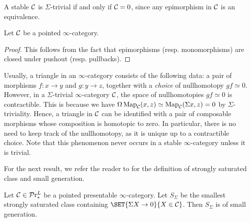 \documentclass[10pt,a4paper,oneside]{article}
\begin{document}
\begin{rem}
A stable \infcat $\mathcal{C}$ is $\Sigma$-trivial if and only if $\mathcal{C}=0$, since any epimorphism in $\mathcal{C}$ is an equivalence.
\end{rem}

\begin{lem}
Let $\mathcal{C}$ be a pointed $\infty$-category.
\end{lem}

\begin{proof}
This follows from the fact that epimorphisms (resp. monomorphisms) are closed under pushout (resp. pullbacks).
\end{proof}


\begin{rem}
Usually, a triangle
in an $\infty$-category consists of the following data: a pair of morphisms
$f \colon x \to y$ and $g \colon y \to z$, together with a \textit{choice} of nullhomotopy
$g f \simeq 0$.
However, in a $\Sigma$-trivial $\infty$-category $\mathcal{C}$, the space of nullhomotopies $g f \simeq 0$ is contractible. This is because we have $\Omega\operatorname{Map}_{\mathcal{C}}(x,z) \simeq \operatorname{Map}_{\mathcal{C}}(\Sigma x, z) = 0$ by $\Sigma$-triviality. Hence, a triangle in $\mathcal{C}$ can be identified with a pair of composable morphisms whose composition is homotopic to zero. In particular, there is no need to keep track of the nullhomotopy, as it is unique up to a contractible choice. Note that this phenomenon never occurs in a stable $\infty$-category unless it is trivial.
\end{rem}



\begin{rem}
For the next result, we refer the reader to \cite[Definition~5.5.4.5 and Remark~5.5.4.7]{htt} for the definition of strongly saturated class and small generation.
\end{rem}

\begin{lem}\label{Ssigma}
Let $\mathcal{C}\in\mathcal{P}\mathrm{r}^L_{*}$ be a pointed presentable $\infty$-category. Let $S_\Sigma$ be the smallest strongly saturated class containing $\SET{\Sigma X\to 0}{X\in\mcc}$. Then $S_\Sigma$ is of small generation.
\end{lem}
\end{document}
